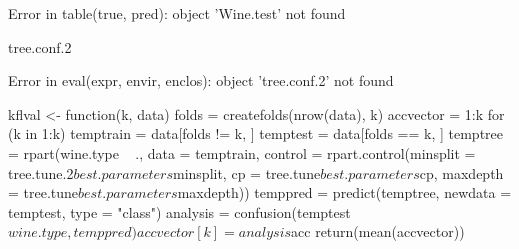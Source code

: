 \documentclass[letterpaper]{article}\usepackage[]{graphicx}\usepackage[]{color}
\begin{document}
\begin{Schunk}
\begin{Soutput}
\end{Soutput}
\begin{Soutput}
Error in table(true, pred): object 'Wine.test' not found
\end{Soutput}
\begin{Sinput}
tree.conf.2
\end{Sinput}
\begin{Soutput}
Error in eval(expr, envir, enclos): object 'tree.conf.2' not found
\end{Soutput}
\begin{Sinput}
kflval <- function(k, data) {
    folds = createfolds(nrow(data), k)
    accvector = 1:k
    for (k in 1:k) {
        temptrain = data[folds != k, ]
        temptest = data[folds == k, ]
        temptree = rpart(wine.type ~ ., data = temptrain, control = rpart.control(minsplit = tree.tune.2$best.parameters$minsplit, 
            cp = tree.tune$best.parameters$cp, maxdepth = tree.tune$best.parameters$maxdepth))
        temppred = predict(temptree, newdata = temptest, type = "class")
        analysis = confusion(temptest$wine.type, temppred)
        accvector[k] = analysis$acc
    }
    return(mean(accvector))
}


\end{Sinput}
\end{Schunk}
\end{document}
